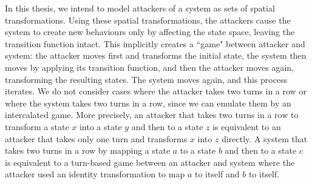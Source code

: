 

In this thesis, we intend to model attackers of a system as sets of spatial transformations. Using these spatial transformations, the attackers cause the system to create new behaviours only by affecting the state space, leaving the transition function intact. This implicitly creates a ``game" between attacker and system: the attacker moves first and transforms the initial state, the system then moves by applying its transition function, and then the attacker moves again, transforming the resulting states. The system moves again, and this process iterates. We do not consider cases where the attacker takes two turns in a row or where the system takes two turns in a row, since we can emulate them by an intercalated game. More precisely, an attacker that takes two turns in a row to transform a state $x$ into a state $y$ and then to a state $z$ is equivalent to an attacker that takes only one turn and transforms $x$ into $z$ directly. A system that takes two turns in a row by mapping a state $a$ to a state $b$ and then to a state $c$ is equivalent to a turn-based game between an attacker and system where the attacker used an identity transformation to map $a$ to itself and $b$ to itself. 

